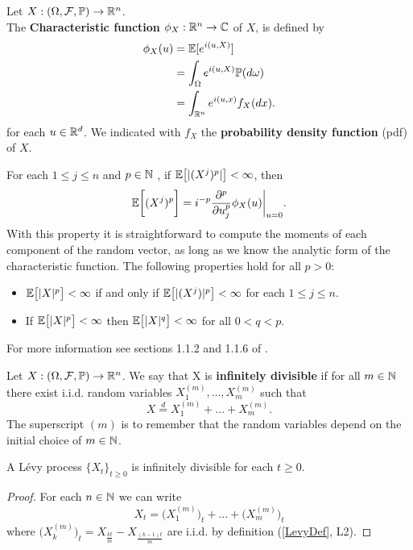 \begin{Definition} \label{chf}
Let $X:(\Omega,\mathcal{F}, \mathbb{P}) \to \mathbb{R}^n$.\\ 
The \textbf{Characteristic function} $\phi_X:\mathbb{R}^n \to \mathbb{C}$  of $X$, is defined by
\begin{align}
\phi_{X}(u) &= \mathbb{E} [e^{i(u,X)}] \nonumber \\
            &= \int_{\Omega} e^{i(u,X)} \mathbb{P}(d\omega) \nonumber \\
            &= \int_{\mathbb{R}^n} e^{i(u,x)} f_X(dx).
\end{align}
for each $u \in \mathbb{R}^d$. We indicated with $f_X$ the \textbf{probability density function} (pdf) of $X$.
\end{Definition}
For each $1 \leq j \leq n$ and $p \in \mathbb{N}$ , if $\mathbb{E}\bigl[ |(X^j)^{p}| \bigr] < \infty$, then 
\begin{equation}\label{moments}
 \mathbb{E}\biggl[ (X^j)^{p} \biggr] = i^{-p}\frac{\partial^p}{\partial u_j^{p}} \phi_X(u) \biggr|_{u=0} .
\end{equation}
With this property it is straightforward to compute the moments of each component of the random vector, as long as we know the analytic form 
of the characteristic function.
The following properties hold for all $p>0$:
\begin{itemize}
 \item $\mathbb{E} \bigl[ |X|^p \bigr] < \infty $ if and only if $\mathbb{E} \bigl[ |(X^j)|^p \bigr] < \infty $ for each $1 \leq j \leq n$. 
 \item If $\mathbb{E} \bigl[ |X|^p \bigr] < \infty $ then $\mathbb{E} \bigl[ |X|^q \bigr] < \infty $ for all $0 < q < p$.
\end{itemize}
For more information see sections 1.1.2 and 1.1.6 of \cite{Applebaum}.
\begin{Definition}\label{inf_div}
 Let $X:(\Omega,\mathcal{F}, \mathbb{P}) \to \mathbb{R}^n$.
 We say that X is \textbf{infinitely divisible} if for all $m \in \mathbb{N}$ there exist i.i.d. random variables $X_1^{(m)},...,X_m^{(m)}$
 such that
 \begin{equation}
  X \overset{d}{=} X_1^{(m)} + ... + X_m^{(m)}.
 \end{equation}
 The superscript $(m)$ is to remember that the random variables depend on the initial choice of $m\in \mathbb{N}$.
\end{Definition}

\begin{Theorem}
 A Lévy process $\{X_t\}_{t \ge 0}$ is infinitely divisible for each $t\geq0$. 
\end{Theorem}
\begin{proof}
 For each $n \in \mathbb{N}$ we can write 
 $$ X_t = \bigl( X_1^{(m)} \bigr)_t + ... + \bigl( X_m^{(m)} \bigr)_t $$
 where $ \bigl( X_k^{(m)} \bigr)_t = X_{\frac{kt}{m}} - X_{\frac{(k-1)t}{m}} $ are i.i.d. by definition (\ref{LevyDef}, L2).
\end{proof}

